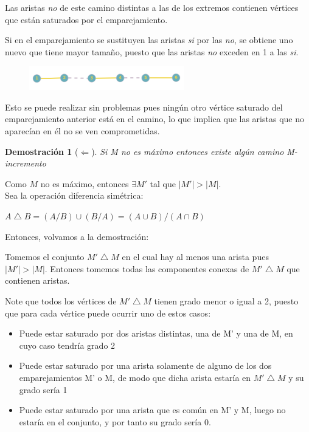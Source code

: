 \documentclass[a4paper,1pt]{report}
\newtheorem*{dem}{Demostración}
\begin{document}
Las aristas \textit{no} de este camino distintas a las de los extremos contienen vértices que están saturados por el emparejamiento.

Si en el emparejamiento se sustituyen las aristas \textit{si} por las \textit{no}, se obtiene uno nuevo que tiene mayor tamaño, puesto que las aristas \textit{no}  exceden en 1 a las \textit{si}.
\begin{figure}[H]
    \centering
    \includegraphics[width=0.6\textwidth]{figures7/mnoincremento.png}
\end{figure} 

Esto se puede realizar sin problemas pues ningún otro vértice saturado del emparejamiento anterior está en el camino, lo que implica que las aristas que no aparecían en él no se ven comprometidas.\\

\begin{dem}[$\Leftarrow$]
    Si M no es máximo entonces existe algún camino M-incremento
\end{dem}

Como $M$ no es m\'aximo, entonces $\exists M'$ tal que $|M'| > |M|$.\\

Sea la operación diferencia simétrica:

$A\bigtriangleup B = (A/B) \cup (B/A) = (A\cup B) / (A\cap B)$

Entonces, volvamos a la demostración:

Tomemos el conjunto $M'\bigtriangleup M$ en el cual hay al menos una arista pues \\
$|M'|>|M|$. Entonces tomemos todas las componentes conexas de $M'\bigtriangleup M$ que contienen aristas. 

Note que todos los vértices de $M'\bigtriangleup M$ tienen grado menor o igual a 2, puesto que para cada v\'ertice puede ocurrir uno de estos casos:
\begin{itemize}
 \item Puede estar saturado por dos aristas distintas, una de M' y una de M, en cuyo caso tendría grado 2
 \item Puede estar saturado por una arista solamente de alguno de los dos emparejamientos M' o M, de modo que dicha arista estaría en $M'\bigtriangleup M$ y su grado sería 1
 \item Puede estar saturado por una arista que es común en M' y M, luego no estaría en el conjunto, y por tanto su grado sería 0.
\end{itemize}
\end{document}
